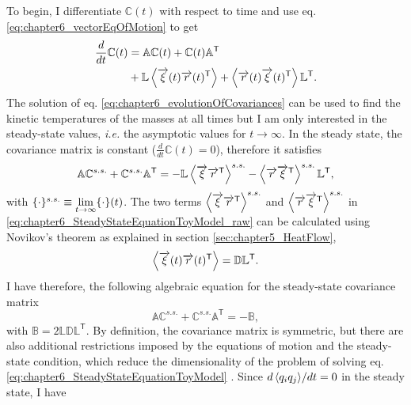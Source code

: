 To begin, I differentiate $\mathbb{C}(t)$ with respect to time and use eq. \eqref{eq:chapter6_vectorEqOfMotion} to get
%
\begin{align}
  \frac{d}{dt}\mathbb{C}(t) &=
  \mathbb{A}\mathbb{C}(t) +
  \mathbb{C}(t) \mathbb{A}^\mathsf{T}
  \nonumber\\
  &+
  \mathbb{L}\expval{ \overrightarrow{\xi}(t)\overrightarrow{r}(t)^\mathsf{T}}
+
  \expval{ \overrightarrow{r}(t)\overrightarrow{\xi}(t)^\mathsf{T}}\mathbb{L}^\mathsf{T}.
  \label{eq:chapter6_evolutionOfCovariances}
\end{align}
%
The solution of eq. \eqref{eq:chapter6_evolutionOfCovariances} can be used to find the kinetic temperatures of the masses at all times but I am only interested in the steady-state values, \textit{i.e.} the asymptotic values for $t\to \infty$. In the steady state, the covariance matrix is constant ($\frac{d}{dt}\mathbb{C}(t)=0$), therefore it satisfies
%
\begin{equation}
  \mathbb{A}\mathbb{C}^{s.s.} +
  \mathbb{C}^{s.s.} \mathbb{A}^\mathsf{T}=
  - \mathbb{L}\expval{ \overrightarrow{\xi}\overrightarrow{r}^\mathsf{T}}^{s.s.}
  - \expval{ \overrightarrow{r}\overrightarrow{\xi}^\mathsf{T}}^{s.s.}\mathbb{L}^\mathsf{T},
  \label{eq:chapter6_SteadyStateEquationToyModel_raw}
\end{equation}
%
with $\small\{\cdot\small\}^{s.s.}\equiv \lim\limits_{t \to \infty} \small\{\cdot\small\}(t)$. The two terms $\expval{ \overrightarrow{\xi}\overrightarrow{r}^\mathsf{T}}^{s.s.}$ and  $\expval{\overrightarrow{r}\overrightarrow{\xi}^\mathsf{T}}^{s.s.}$ in \eqref{eq:chapter6_SteadyStateEquationToyModel_raw} can be calculated using Novikov's theorem \cite{Novikov1965} as explained in section \ref{sec:chapter5_HeatFlow},
%
\begin{equation}
  \expval{ \overrightarrow{\xi}(t)\overrightarrow{r}(t)^\mathsf{T}} = \mathbb{D}\mathbb{L}^\mathsf{T}.
\end{equation}
%
I have therefore, the following algebraic equation for the steady-state covariance matrix
%
\begin{equation}
  \mathbb{A}\mathbb{C}^{s.s.} +
  \mathbb{C}^{s.s.}\mathbb{A}^\mathsf{T}
  =
  -\mathbb{B},
  \label{eq:chapter6_SteadyStateEquationToyModel}
\end{equation}
%
with $\mathbb{B} = 2 \mathbb{L}\mathbb{D}\mathbb{L}^\mathsf{T}$. By definition, the covariance matrix is  symmetric, but there are also  additional restrictions imposed by the equations of motion and the steady-state condition, which reduce the dimensionality of the problem of solving eq. \eqref{eq:chapter6_SteadyStateEquationToyModel} \cite{Simon2019}. Since ${d \expval{ q_i q_j }}/{dt} = 0$ in the steady state, I have

